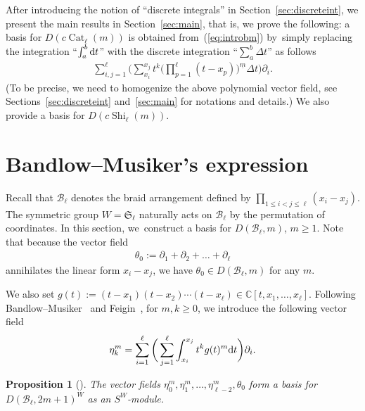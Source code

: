 \documentclass[10pt,a4paper]{amsart}
\numberwithin{equation}{section}
\newtheorem{Proposition}[Theorem]{Proposition}
{ \theoremstyle{definition}
\newtheorem{Definition}[Theorem]{Definition}
\newtheorem{Example}[Theorem]{Example}
\newtheorem{Remark}[Theorem]{Remark} }
\newcommand{\B}{\mathcal{B}}
\newcommand{\C}{\mathbb{C}}
\newcommand{\Cat}{\operatorname{Cat}}
\newcommand{\Shi}{\operatorname{Shi}}
\newcommand{\sint}{\sum\nolimits}
\begin{document}
After introducing the notion of ``discrete integrals'' in Section~\ref{sec:discreteint},
we present the main results in Section~\ref{sec:main}, that is, we prove the
following: a basis for $D(c\Cat_\ell(m))$ is obtained from~(\ref{eq:introbm}) by~simply replacing the integration ``$\int_a^b {\rm d}t$''
with the discrete integration ``$\sint_a^b\Delta t$'' as follows
\begin{gather*}
\sum_{i, j=1}^\ell
\bigg(\sint_{x_i}^{x_j}t^k\bigg(\prod_{p=1}^\ell(t-x_p)\bigg)^{\underline{m}} \Delta t\bigg)\partial_i.
\end{gather*}
(To be precise, we need to homogenize the above polynomial vector field,
see Sections~\ref{sec:discreteint} and~\ref{sec:main} for notations and details.)
We also provide a basis for $D(c\Shi_\ell(m))$.

\section{Bandlow--Musiker's expression}\label{sec:bm}

Recall that $\B_\ell$ denotes the braid arrangement defined by
$\prod_{1\leq i<j\leq\ell}(x_i-x_j)$. The symmetric group
$W=\mathfrak{S}_\ell$ naturally acts on $\B_\ell$ by the permutation of
coordinates.
In this section, we~construct a basis for $D(\B_\ell, m)$, $m\geq 1$.
Note that because the vector field
\begin{gather*}
\theta_0:=\partial_1+\partial_2+\dots+\partial_\ell
\end{gather*}
annihilates the linear form $x_i-x_j$, we have $\theta_0\in D(\B_\ell, m)$
for any $m$.


We also set
$g(t):=(t-x_1)(t-x_2)\cdots(t-x_\ell)\in \C[t, x_1, \dots, x_\ell]$.
Following Bandlow--Musiker~\cite{bm} and Feigin~\cite{feigin},
for $m, k\geq 0$, we introduce the following vector field
\begin{gather}
\label{eq:eta}
\eta_k^m=\sum_{i=1}^\ell\bigg(\sum_{j=1}^\ell\int_{x_i}^{x_j}t^kg(t)^m {\rm d}t\bigg)\partial_i.
\end{gather}
\begin{Proposition}[\cite{bm, feigin}]\label{prop:bm}
The vector fields
$\eta_0^m, \eta_1^m, \dots, \eta_{\ell-2}^m, \theta_0$ form a
basis for $D(\B_\ell, 2m+1)^W$ as an $S^W$-module.
\end{Proposition}
\end{document}
